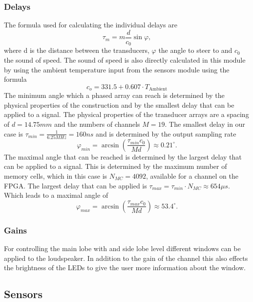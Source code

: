 \subsubsection{Delays}
The formula used for calculating the individual delays are
\begin{equation}
    \tau_m = m\frac{d}{c_0}\sin{\varphi},
\end{equation}
where d is the distance between the transducers, $\varphi$ the angle to steer to and $c_0$ the sound of speed. The sound of speed is also directly calculated in this module by using the ambient temperature input from the sensors module using the formula
\begin{equation}
    c_o = 331.5 + 0.607 \cdot T_{\text{Ambient}}
\end{equation}
The minimum angle which a phased array can reach is determined by the physical properties of the construction and by the smallest delay that can be applied to a signal. The physical properties of the transducer arrays are a spacing of $d=14.75mm$ and the numbers of channels $M=19$. The smallest delay in our case is $\tau_{min} = \frac{1}{6.25MHz} = 160ns$ and is determined by the output sampling rate
\begin{equation}
    \varphi_{min} = \arcsin{\left ( \frac{\tau_{min} c_0}{M d} \right ) } \approx  0.21^{\circ}.
\end{equation}
The maximal angle that can be reached is determined by the largest delay that can be applied to a signal. This is determined by the maximum number of memory cells, which in this case is $N_{MC} = 4092$, available for a channel on the FPGA. The largest delay that can be applied is $\tau_{max} = \tau_{min} \cdot N_{MC} \approx 654 \mu s $. Which leads to a maximal angle of 
\begin{equation}
    \varphi_{max} = \arcsin{\left ( \frac{\tau_{max} c_0}{M d} \right ) } \approx  53.4^{\circ}.
\end{equation}
\subsubsection{Gains}
For controlling the main lobe with and side lobe level different windows can be applied to the loudspeaker. In addition to the gain of the channel this also effects the brightness of the LEDs to give the user more information about the window. 
\subsection{Sensors}

